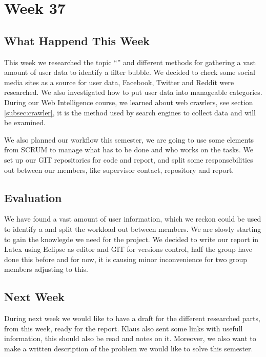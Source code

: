\section*{Week 37}
\subsection*{What Happend This Week}
This week we researched the topic  ``\fb'' and different methods for gathering a
vast amount of user data to identify a filter bubble. We decided to check some
social media sites as a source for user data, Facebook, Twitter and Reddit were
researched. We also investigated how to put user data into manageable
categories. During our Web Intelligence course, we learned about web crawlers,
see section \ref{subsec:crawler}, it is the method used by search engines to
collect data and will be examined.

We also planned our workflow this semester, we are going to use some elements
from SCRUM to manage what has to be done and who works on the tasks. We set up
our GIT repositories for code and report, and split some responsebilities out
between our members, like supervisor contact, repository and report.

\subsection*{Evaluation}
We have found a vast amount of user information, which we reckon could be used
to identify a \fb and split the workload out between members. We are slowly
starting to gain the knowlegde we need for the project. We decided to write our
report in Latex using Eclipse as editor and GIT for versions control, half the
group have done this before and for now, it is causing minor inconvenience for
two group members adjusting to this.

\subsection*{Next Week}
During next week we would like to have a draft for the different researched
parts, from this week, ready for the report. Klaus also sent some links with
usefull information, this should also be read and notes on it. Moreover, we also
want to make a written description of the problem we would like to solve this
semester.



